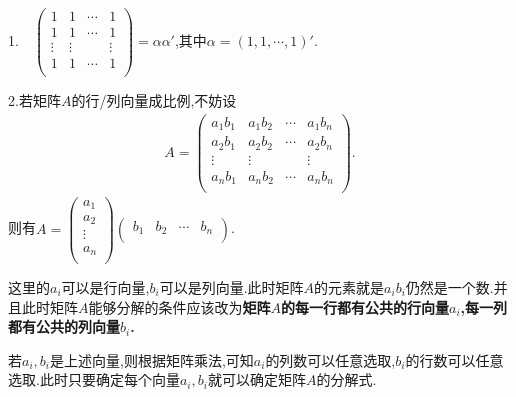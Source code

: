 \documentclass[../../main.tex]{subfiles}%
\begin{document}
\begin{proposition}[一些能写成两个向量乘积的矩阵]\label{proposition:一些能写成两个向量乘积的矩阵}
1.$\quad$$\left( \begin{matrix}
1&		1&		\cdots&		1\\
1&		1&		\cdots&		1\\
\vdots&		\vdots&		&		\vdots\\
1&		1&		\cdots&		1\\
\end{matrix} \right) =\alpha\alpha'$,其中$\alpha =\left( 1,1,\cdots ,1 \right)' $.

2.若矩阵$A$的行/列向量成比例,不妨设
\begin{align*}
A=\left( \begin{matrix}
a_1b_1&		a_1b_2&		\cdots&		a_1b_n\\
a_2b_1&		a_2b_2&		\cdots&		a_2b_n\\
\vdots&		\vdots&		&		\vdots\\
a_nb_1&		a_nb_2&		\cdots&		a_nb_n\\
\end{matrix} \right) .
\end{align*}
则有$A =\left( \begin{array}{c}
a_1\\
a_2\\
\vdots\\
a_n\\
\end{array} \right) \left( \begin{matrix}
b_1&		b_2&		\cdots&		b_n\\
\end{matrix} \right) $.
\end{proposition}
\begin{note}
这里的$a_i$可以是行向量,$b_i$可以是列向量.此时矩阵$A$的元素就是$a_ib_i$仍然是一个数.并且此时矩阵$A$能够分解的条件应该改为\textbf{矩阵$A$的每一行都有公共的行向量$a_i$,每一列都有公共的列向量$b_i$.}

\begin{remark}
若$a_i,b_i$是上述向量,则根据矩阵乘法,可知$a_i$的列数可以任意选取,$b_i$的行数可以任意选取.此时只要确定每个向量$a_i,b_i$就可以确定矩阵$A$的分解式.
\end{remark}
\end{note}
\end{document}
